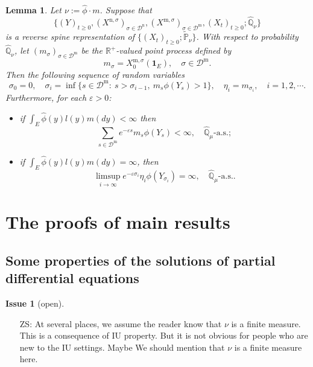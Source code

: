 \documentclass[12pt,a4paper]{amsart}
\numberwithin{equation}{section}
\theoremstyle{plain}
\newtheorem{lem}[thm]{Lemma}
\theoremstyle{definition}
\newtheorem{iss}{Issue}
\begin{document}
\begin{lem}\label{lem:import_lemma}
Let $\nu := \widehat \phi \cdot m$.
Suppose that
\[\{(Y)_{t\geq 0}, (X^{\mathrm n, \sigma})_{\sigma\in \mathcal D^\mathrm n}, (X^{\mathrm m, \sigma})_{\sigma \in \mathcal D^\mathrm m}, (X_t)_{t\geq 0}; \widehat{\mathbb Q}_{\nu}\}\]
is a reverse spine representation of $\{(X_t)_{t\geq 0}; \widetilde {\mathbb P}_\nu\}$.
With respect to probability $\widehat{\mathbb Q}_\nu$, let $(m_\sigma)_{\sigma\in \mathcal D^{\mathrm m}}$ be the $\mathbb R^+$-valued point process defined by
  \[
    m_\sigma
    = X^{\mathrm m, \sigma}_0(\mathbf 1_E),
    \quad \sigma \in \mathcal D^{\mathrm m}.
  \]
Then the following sequence of random variables
  \[
    \sigma_0=0,\quad \sigma_i=\inf\{s\in\mathcal D^{\mathrm m}:\ s>\sigma_{i-1},\ m_s\phi(Y_s)>1\}, \quad\eta_i=m_{\sigma_i},\quad i=1,2,\cdots.
  \]
  Furthermore, for each $\varepsilon>0$:
  \begin{itemize}
  \item
    if $\int_E\widehat{\phi}(y)l(y)m(dy)<\infty$ then
  \[
    \sum_{s\in\mathcal D^{\mathrm m}} e^{-\varepsilon s}m_s\phi(Y_s)
    < \infty,
    \quad \widehat{\mathbb Q}_{\mu}\text{-a.s.};
  \]
\item
  if $ \int_E\widehat{\phi}(y)l(y)m(dy)=\infty$, then
  \[
    \limsup_{i\rightarrow\infty} e^{-\varepsilon\sigma_i}\eta_i \phi(Y_{\sigma_i})
    =\infty,
    \quad \widehat{\mathbb Q}_{\mu}\text{-a.s.}.
  \]
\end{itemize}
\end{lem}

\section{The proofs of main results}
\subsection{Some properties of the solutions of partial differential equations}
\begin{iss}[open]~
  \begin{itemize}
  \item[ZS:]
At several places, we assume the reader know that $\nu$ is a finite measure. This is a consequence of IU property. But it is not obvious for people who are new to the IU settings. Maybe We should mention that $\nu$ is a finite measure here.
  \end{itemize}
\end{iss}
\end{document}
